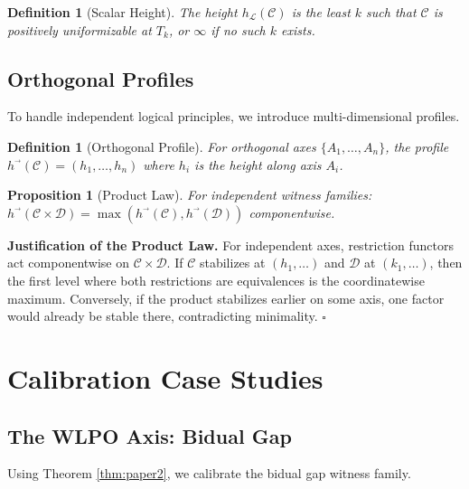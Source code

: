 \documentclass[11pt]{article}
\newtheorem{definition}[theorem]{Definition}
\newtheorem{proposition}[theorem]{Proposition}
\newenvironment{proof}[1][Proof]{\noindent\textbf{#1.}\hspace{0.5em}}{\hfill$\square$\par}
\begin{document}
\begin{definition}[Scalar Height]
The \emph{height} $h_{\mathcal{L}}(\mathcal{C})$ is the least $k$ such that $\mathcal{C}$ is positively uniformizable at $T_k$, or $\infty$ if no such $k$ exists.
\end{definition}

\subsection{Orthogonal Profiles}

To handle independent logical principles, we introduce multi-dimensional profiles.

\begin{definition}[Orthogonal Profile]
For orthogonal axes $\{A_1, \ldots, A_n\}$, the \emph{profile} $h^{\vec{}}(\mathcal{C}) = (h_1, \ldots, h_n)$ where $h_i$ is the height along axis $A_i$.
\end{definition}

\begin{proposition}[Product Law]
For independent witness families: $h^{\vec{}}(\mathcal{C} \times \mathcal{D}) = \max(h^{\vec{}}(\mathcal{C}), h^{\vec{}}(\mathcal{D}))$ componentwise.
\end{proposition}

\begin{proof}[Justification of the Product Law]
For independent axes, restriction functors act componentwise on $\mathcal{C}\times\mathcal{D}$.
If $\mathcal{C}$ stabilizes at $(h_1,\dots)$ and $\mathcal{D}$ at $(k_1,\dots)$, then the first level
where both restrictions are equivalences is the coordinatewise maximum. Conversely, if the product
stabilizes earlier on some axis, one factor would already be stable there, contradicting minimality.
\end{proof}

\section{Calibration Case Studies}

\subsection{The WLPO Axis: Bidual Gap}

Using Theorem \ref{thm:paper2}, we calibrate the bidual gap witness family.
\end{document}
